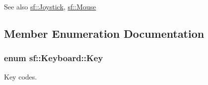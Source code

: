 \begin{DoxySeeAlso}{See also}
\hyperlink{classsf_1_1_joystick}{sf\+::\+Joystick}, \hyperlink{classsf_1_1_mouse}{sf\+::\+Mouse} 
\end{DoxySeeAlso}


\subsection{Member Enumeration Documentation}
\hypertarget{classsf_1_1_keyboard_acb4cacd7cc5802dec45724cf3314a142}{
\subsubsection[{Key}]{\setlength{\rightskip}{0pt plus 5cm}enum {\bf sf\+::\+Keyboard\+::\+Key}}}\label{classsf_1_1_keyboard_acb4cacd7cc5802dec45724cf3314a142}


Key codes. 

